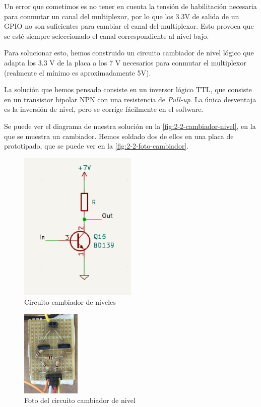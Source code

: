 Un error que cometimos es no tener en cuenta la tensión de habilitación necesaria para conmutar un canal del multiplexor, por lo que los 3.3V de salida de un GPIO no son suficientes para cambiar el canal del multiplexor. Esto provoca que se esté siempre seleccionado el canal correspondiente al nivel bajo.

Para solucionar esto, hemos construido un circuito cambiador de nivel lógico que adapta los 3.3 V de la placa a los 7 V necesarios para conmutar el multiplexor (realmente el mínimo es aproximadamente 5V).

La solución que hemos pensado consiste en un inversor lógico TTL, que consiste en un transistor bipolar NPN con una resistencia de \textit{Pull-up}. La única desventaja es la inversión de nivel, pero se corrige fácilmente en el software.

Se puede ver el diagrama de nuestra solución en la \autoref{fig:2-2-cambiador-nivel}, en la que se muestra un cambiador. Hemos soldado dos de ellos en una placa de prototipado, que se puede ver en la \autoref{fig:2-2-foto-cambiador}.

\begin{figure}[h]
    \centering
    \includegraphics[width=0.5\textwidth]{images/2/2-2/circuitoCambiadorNivel.png}
    \caption{Circuito cambiador de niveles}
    \label{fig:label}
\end{figure}

\begin{figure}[h]
    \centering
    \includegraphics[width=0.25\textwidth]{images/2/2-2/cambiadorNivel.jpg}
    \caption{Foto del circuito cambiador de nivel}
    \label{fig:2-2-foto-cambiador}
\end{figure}
